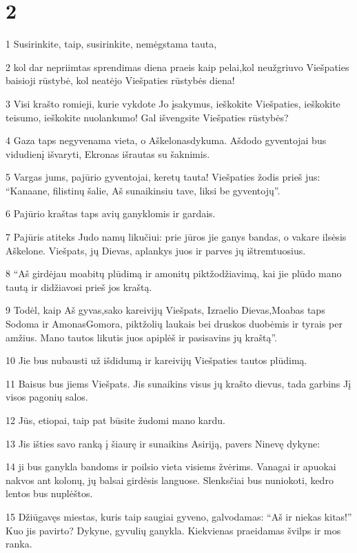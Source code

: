 \chapter{2}


\par 1 Susirinkite, taip, susirinkite, nemėgstama tauta, 
\par 2 kol dar nepriimtas sprendimas­ diena praeis kaip pelai,­kol neužgriuvo Viešpaties baisioji rūstybė, kol neatėjo Viešpaties rūstybės diena! 
\par 3 Visi krašto romieji, kurie vykdote Jo įsakymus, ieškokite Viešpaties, ieškokite teisumo, ieškokite nuolankumo! Gal išvengsite Viešpaties rūstybės? 
\par 4 Gaza taps negyvenama vieta, o Aškelonas­dykuma. Ašdodo gyventojai bus vidudienį išvaryti, Ekronas išrautas su šaknimis. 
\par 5 Vargas jums, pajūrio gyventojai, keretų tauta! Viešpaties žodis prieš jus: “Kanaane, filistinų šalie, Aš sunaikinsiu tave, liksi be gyventojų”. 
\par 6 Pajūrio kraštas taps avių ganyklomis ir gardais. 
\par 7 Pajūris atiteks Judo namų likučiui: prie jūros jie ganys bandas, o vakare ilsėsis Aškelone. Viešpats, jų Dievas, aplankys juos ir parves jų ištremtuosius. 
\par 8 “Aš girdėjau moabitų plūdimą ir amonitų piktžodžiavimą, kai jie plūdo mano tautą ir didžiavosi prieš jos kraštą. 
\par 9 Todėl, kaip Aš gyvas,­sako kareivijų Viešpats, Izraelio Dievas,­Moabas taps Sodoma ir Amonas­Gomora, piktžolių laukais bei druskos duobėmis ir tyrais per amžius. Mano tautos likutis juos apiplėš ir pasisavins jų kraštą”. 
\par 10 Jie bus nubausti už išdidumą ir kareivijų Viešpaties tautos plūdimą. 
\par 11 Baisus bus jiems Viešpats. Jis sunaikins visus jų krašto dievus, tada garbins Jį visos pagonių salos. 
\par 12 Jūs, etiopai, taip pat būsite žudomi mano kardu. 
\par 13 Jis išties savo ranką į šiaurę ir sunaikins Asiriją, pavers Ninevę dykyne: 
\par 14 ji bus ganykla bandoms ir poilsio vieta visiems žvėrims. Vanagai ir apuokai nakvos ant kolonų, jų balsai girdėsis languose. Slenksčiai bus nuniokoti, kedro lentos bus nuplėštos. 
\par 15 Džiūgavęs miestas, kuris taip saugiai gyveno, galvodamas: “Aš ir niekas kitas!” Kuo jis pavirto? Dykyne, gyvulių ganykla. Kiekvienas praeidamas švilps ir mos ranka.



